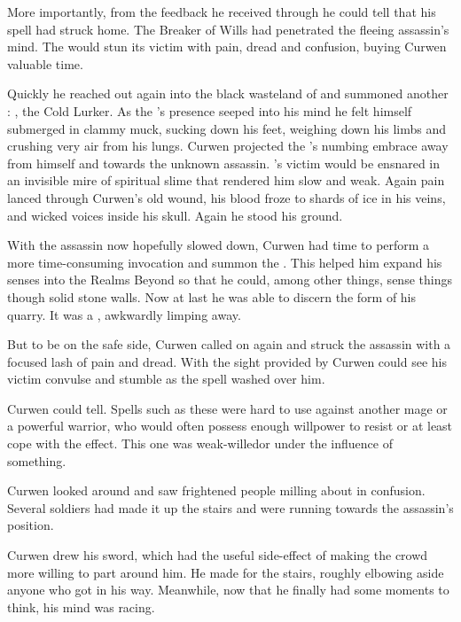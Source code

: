 More importantly, from the feedback he received through \Kithvaz he could tell that his spell had struck home. 
The Breaker of Wills had penetrated the fleeing assassin's mind. 
The \qliphah would stun its victim with pain, dread and confusion, buying Curwen valuable time. 

Quickly he reached out again into the black wasteland of \itzach and summoned another \qliphah:
\OmmonThul, the Cold Lurker. 
As the \qliphah's presence seeped into his mind he felt himself submerged in clammy muck, sucking down his feet, weighing down his limbs and crushing very air from his lungs. 
Curwen projected the \qliphah's numbing embrace away from himself and towards the unknown assassin. 
\OmmonThul's victim would be ensnared in an invisible mire of spiritual slime that rendered him slow and weak. 
Again pain lanced through Curwen's old wound, his blood froze to shards of ice in his veins, and wicked voices \clamoured inside his skull. 
Again he stood his ground. 


With the assassin now hopefully slowed down, Curwen had time to perform a more time-consuming invocation and summon the \qliphah \Dweryog. 
This \qliphah helped him expand his senses into the Realms Beyond so that he could, among other things, sense things though solid stone walls. 
Now at last he was able to discern the form of his quarry. 
It was a \scatha, awkwardly limping away. 

But to be on the safe side, Curwen called on \Kithvaz again and struck the assassin with a focused lash of pain and dread. 
With the sight provided by \Dweryog Curwen could see his victim convulse and stumble as the spell washed over him. 

 Curwen could tell.
Spells such as these were hard to use against another mage or a powerful warrior, who would often possess enough willpower to resist or at least cope with the effect. 
This one was weak-willed\prikker or under the influence of something. 

Curwen looked around and saw frightened people milling about in confusion. 
Several soldiers had made it up the stairs and were running towards the assassin's position.

Curwen drew his sword, which had the useful side-effect of making the crowd more willing to part around him.
He made for the stairs, roughly elbowing aside anyone who got in his way. 
Meanwhile, now that he finally had some moments to think, his mind was racing.

